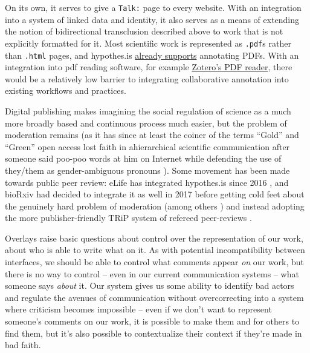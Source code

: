 On its own, it serves to give a \texttt{Talk:} page to every website.
With an integration into a system of linked data and identity, it also
serves as a means of extending the notion of bidirectional transclusion
described above to work that is not explicitly formatted for it. Most
scientific work is represented as \texttt{.pdf}s rather than
\texttt{.html} pages, and hypothes.is
\href{https://web.hypothes.is/help/annotating-locally-saved-pdfs/}{already
supports} annotating PDFs. With an integration into pdf reading
software, for example
\href{https://www.zotero.org/support/pdf_reader_preview}{Zotero's PDF
reader}, there would be a relatively low barrier to integrating
collaborative annotation into existing workflows and practices.

Digital publishing makes imagining the social regulation of science as a
much more broadly based and continuous process much easier, but the
problem of moderation remains (as it has since at least the coiner of
the terms ``Gold'' and ``Green'' open access lost faith in ahierarchical
scientific communication after someone said poo-poo words at him on
Internet while defending the use of they/them as gender-ambiguous
pronouns \citep{harnadSkyWriting1987, harnadScholarlySkywritingPrepublication1990, ellisBooksTranslationWanted1986} ). Some movement has been made
towards public peer review: eLife has integrated hypothes.is since 2016
\citep{ELifePartnersHypothes2016} , and bioRxiv had decided to
integrate it as well in 2017 \citep{dwhlyBioRxivSelectsHypothesis2017}  before getting cold feet about the genuinely hard problem of
moderation (among others \citep{heatherstainesPreprintServicesGather2018} ) and instead adopting the
more publisher-friendly TRiP system of refereed peer-reviews \citep{nateangellAnnouncingTRiPTransparent2019} .

Overlays raise basic questions about control over the representation of
our work, about who is able to write what on it. As with potential
incompatibility between interfaces, we should be able to control what
comments appear \emph{on} our work, but there is no way to control --
even in our current communication systems -- what someone says
\emph{about} it. Our system gives us some ability to identify bad actors
and regulate the avenues of communication without overcorrecting into a
system where criticism becomes impossible -- even if we don't want to
represent someone's comments on our work, it is possible to make them
and for others to find them, but it's also possible to contextualize
their context if they're made in bad faith.

